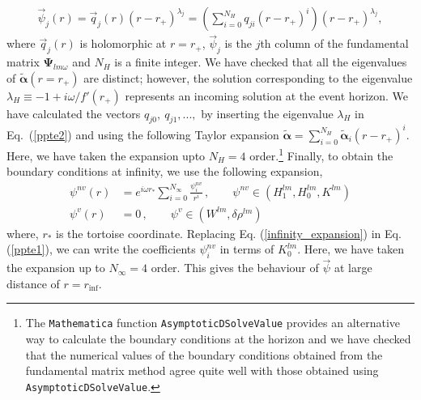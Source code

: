 \documentclass[11pt]{article}
\begin{document}
\begin{equation}\label{fundamental_matrix_regular}
    \begin{aligned}
       \vec{\psi}_j(r)=\vec q_j(r) (r-r_+)^{\lambda_j}=\left(\sum_{i=0}^{N_H}q_{ji} (r-r_+)^{i}\right)(r-r_+)^{\lambda_j},
    \end{aligned}
\end{equation}
where $\vec q_j(r)$ is holomorphic at $r=r_+$, $\vec{\psi}_j$ is the $j$th column of the fundamental matrix $\boldsymbol{\Psi}_{lm\omega}$ and $N_H$ is a finite integer. We have checked that  all the eigenvalues of $\tilde{\boldsymbol{\alpha}}(r=r_+)$ are distinct; however, the solution corresponding to the eigenvalue $\lambda_H\equiv-1+i\omega/f'(r_+)$ represents an incoming solution at the event horizon. We have calculated the vectors $q_{j0},~q_{j1},...,$ by inserting the eigenvalue $\lambda_H$  in Eq.~(\ref{ppte2}) and using the following Taylor expansion $\tilde{\boldsymbol{\alpha}}=\sum_{i=0}^{N_H}\tilde{\boldsymbol{\alpha}}_i(r-r_+)^{i}$. Here, we have taken the expansion upto $N_H=4$ order.\footnote{The \texttt{Mathematica} \cite{Mathematica} function \texttt{AsymptoticDSolveValue} provides an alternative way to calculate the boundary conditions at the horizon and we have checked that the numerical values of the boundary conditions obtained from the fundamental matrix method agree quite well with those obtained using \texttt{AsymptoticDSolveValue}.} Finally, to obtain the boundary conditions at infinity, we use the following expansion, 
\begin{equation}\label{infinity_expansion}
    \begin{aligned}
       \psi^{nv}(r)&=e^{i\omega r_{*}}\sum_{i=0}^{N_\infty}\frac{\psi^{nv}_i}{r^i} \,,\qquad \psi^{nv}\in (H_1^{lm}, H_0^{lm}, K^{lm})\\
       \psi^{v}(r)&=0\,,\qquad \psi^{v}\in ( W^{lm},\delta\rho^{lm})
    \end{aligned}
\end{equation}
where, $r_{*}$ is the tortoise coordinate. Replacing  Eq. (\ref{infinity_expansion}) in Eq. (\ref{ppte1}), we can write the coefficients  $\psi^{nv}_i$ in terms of $K_0^{lm}$. Here, we have taken the expansion up to $N_{\infty}=4$ order. This gives the behaviour of $\vec\psi$ at large distance of $r=r_{\textrm{inf}}$.\par
\end{document}
